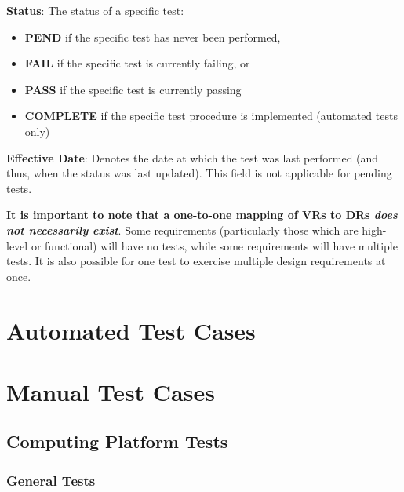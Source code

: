 \documentclass[10pt,letterpaper]{article}
\begin{document}
\textbf{Status}: The status of a specific test:
\begin{itemize}
	\item \textbf{PEND} if the specific test has never been performed,
	\item \textbf{FAIL} if the specific test is currently failing, or
	\item \textbf{PASS} if the specific test is currently passing
	\item \textbf{COMPLETE} if the specific test procedure is implemented (automated tests only)
\end{itemize}

\textbf{Effective Date}: Denotes the date at which the test was last performed (and thus, when the status was last updated). This field is not applicable for pending tests.

\textbf{It is important to note that a one-to-one mapping of VRs to DRs \textit{does not necessarily exist}}. Some requirements (particularly those which are high-level or functional) will have no tests, while some requirements will have multiple tests. It is also possible for one test to exercise multiple design requirements at once.

\newpage
\section{Automated Test Cases} \label{begintest}



%

\newpage
\section{Manual Test Cases}

\subsection{Computing Platform Tests}
\subsubsection{General Tests}

\end{document}
